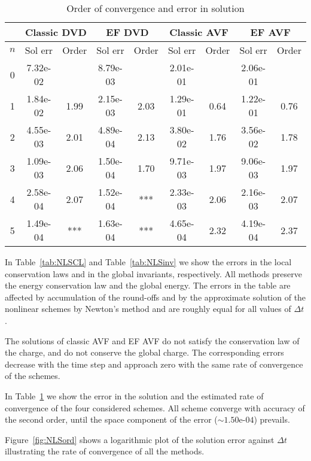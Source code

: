 \documentclass[twoside]{article}
\numberwithin{equation}{section}
\begin{document}
\begin{table}[t]
\caption{Order of convergence and error in solution}\label{tab:NLSerr}
\small
\centering
\begingroup
\setlength{\tabcolsep}{6pt} 
\renewcommand{\arraystretch}{1.12} 
\begin{tabular}{|c||c|c||c|c||c|c||c|c|}
\hline
&  \multicolumn{2}{|c||}{Classic DVD \cite{Matsuo}} & \multicolumn{2}{|c||}{EF DVD} &\multicolumn{2}{|c||}{Classic AVF \cite{Quisp}} & \multicolumn{2}{|c|}{EF AVF \cite{Miya}}\\ 
\hline
$n$ & Sol err & Order & Sol err & Order & Sol err & Order & Sol err & Order\\
\hline
0& 7.32e-02 &  & 8.79e-03 & & 2.01e-01 &  & 2.06e-01 & \\
1& 1.84e-02 & {1.99} & 2.15e-03 & {2.03} & 1.29e-01 & {0.64} & 1.22e-01 & {0.76}\\
2& 4.55e-03 & 2.01 & 4.89e-04 & 2.13 & 3.80e-02 & 1.76 & 3.56e-02 & 1.78\\
3& 1.09e-03 & 2.06 & 1.50e-04 & 1.70 & 9.71e-03 & 1.97 & 9.06e-03 & 1.97 \\
4& 2.58e-04 & 2.07 & 1.52e-04 & *** & 2.33e-03 & 2.06 & 2.16e-03 & 2.07\\
5 & 1.49e-04 & *** & 1.63e-04 & *** & 4.65e-04 & 2.32 &  4.19e-04 & 2.37 \\
\hline
\end{tabular}
\endgroup
\end{table}
In Table~\ref{tab:NLSCL} and Table~\ref{tab:NLSinv} we show the errors in the local conservation laws and in the global invariants, respectively. All methods preserve the energy conservation law and the global energy. The errors in the table are affected by accumulation of the round-offs and by the approximate solution of the nonlinear schemes by Newton's method and are roughly equal for all values of $\Delta t$. 

The solutions of classic AVF and EF AVF do not satisfy the conservation law of the charge, and do not conserve the global charge. The corresponding errors decrease with the time step and approach zero with the same rate of convergence of the schemes.

In Table~\ref{tab:NLSerr} we show the error in the solution and the estimated rate of convergence of the four considered schemes. All scheme converge with accuracy of the second order, until the space component of the error ($\sim 1.50\text{e-04}$) prevails. 

Figure~\ref{fig:NLSord} shows a logarithmic plot of the solution error against $\Delta t$ illustrating the rate of convergence of all the methods.
\end{document}
